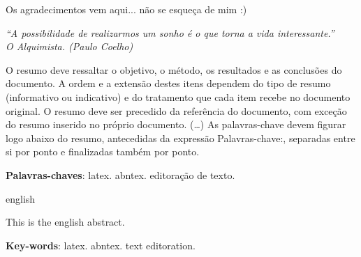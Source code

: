 \documentclass[
	12pt,				%
	oneside, %
	a4paper,			%
	english,			%
	brazil				%
	]{abntex2}
\begin{document}

\begin{agradecimentos}
\noindent Os agradecimentos vem aqui... não se esqueça de mim :) 

\end{agradecimentos}

\begin{epigrafe}
    \vspace*{\fill}
	\begin{flushright}
		\textit{``A possibilidade de realizarmos um sonho é o que torna a vida interessante.'' \\ O Alquimista. (Paulo Coelho)}
	\end{flushright}
\end{epigrafe}


\setlength{\absparsep}{18pt} %
\begin{resumo}
 \noindent O resumo deve ressaltar o objetivo, o método, os resultados e as conclusões do documento. A ordem e a extensão
 destes itens dependem do tipo de resumo (informativo ou indicativo) e do tratamento que cada item recebe no documento original. O resumo deve ser precedido da referência do documento, com exceção do resumo inserido no
 próprio documento. (\ldots) As palavras-chave devem figurar logo abaixo do resumo, antecedidas da expressão Palavras-chave:, separadas entre si por
 ponto e finalizadas também por ponto.

 \textbf{Palavras-chaves}: latex. abntex. editoração de texto.
\end{resumo}

\begin{resumo}[Abstract]
 \begin{otherlanguage*}{english}

\noindent This is the english abstract.

   \vspace{\onelineskip}

   \noindent
   \textbf{Key-words}: latex. abntex. text editoration.
 \end{otherlanguage*}
\end{resumo}
\end{document}
